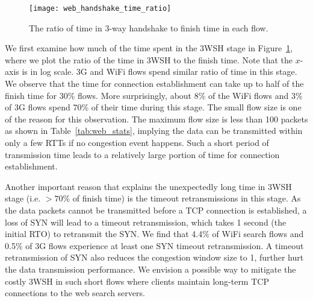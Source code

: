 \begin{figure}[th]
\centering
\texttt{[image: web\_handshake\_time\_ratio]}
\caption{The ratio of time in 3-way handshake to finish time in each flow.}
\label{fig:web_handshake_ratio}
\end{figure}

We first examine how much of the time spent in the 3WSH stage in Figure~\ref{fig:web_handshake_ratio}, where we plot the ratio of the time in 3WSH to the finish time. Note that the $x$-axis is in log scale. 3G and WiFi flows spend similar ratio of time in this stage. We observe that the time for connection establishment can take up to half of the finish time for 30\% flows. More surprisingly, about 8\% of the WiFi flows and 3\% of 3G flows spend 70\% of their time during this stage. The small flow size is one of the reason for this observation. The maximum flow size is less than 100 packets as shown in Table~\ref{tab:web_stats}, implying the data can be transmitted within only a few RTTs if no congestion event happens. Such a short period of transmission time leads to a relatively large portion of time for connection establishment.




Another important reason that explains the unexpectedly long time in 3WSH stage (i.e. $>70\%$ of finish time) is the timeout retransmissions in this stage. As the data packets cannot be transmitted before a TCP connection is established, a loss of SYN will lead to a timeout retransmission, which takes 1 second (\ie the initial RTO) to retransmit the SYN. We find that 4.4\% of WiFi search flows and 0.5\% of 3G flows experience at least one SYN timeout retransmission. A timeout retransmission of SYN also reduces the congestion window size to 1, further hurt the data transmission performance. We envision a possible way to mitigate the costly 3WSH in such short flows where clients maintain long-term TCP connections to the web search servers.

